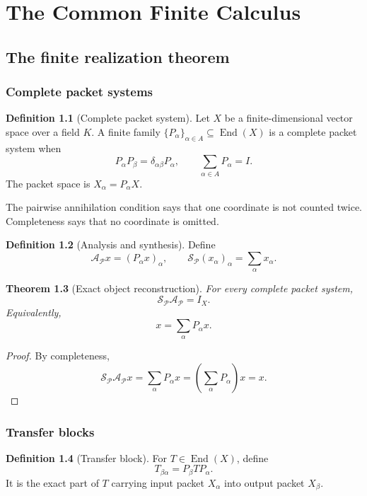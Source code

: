 \documentclass[11pt,oneside]{book}
\newtheorem{theorem}{Theorem}[chapter]
\theoremstyle{definition}
\newtheorem{definition}[theorem]{Definition}
\theoremstyle{remark}
\newcommand{\Id}{I}
\newcommand{\Acal}{\mathcal A}
\newcommand{\Scal}{\mathcal S}
\begin{document}
\tableofcontents

\mainmatter

\part{The Common Finite Calculus}



\chapter{The finite realization theorem}\label{ch:core}

\section{Complete packet systems}
\begin{definition}[Complete packet system]
Let $X$ be a finite-dimensional vector space over a field $K$. A finite family $\{P_\alpha\}_{\alpha\in A}\subseteq\operatorname{End}(X)$ is a complete packet system when
\[
P_\alpha P_\beta=\delta_{\alpha\beta}P_\alpha,
\qquad
\sum_{\alpha\in A}P_\alpha=\Id.
\]
The packet space is $X_\alpha=P_\alpha X$.
\end{definition}

The pairwise annihilation condition says that one coordinate is not counted twice. Completeness says that no coordinate is omitted.

\begin{definition}[Analysis and synthesis]
Define
\[
\Acal_{\mathcal P}x=(P_\alpha x)_\alpha,
\qquad
\Scal_{\mathcal P}(x_\alpha)_\alpha=\sum_\alpha x_\alpha.
\]
\end{definition}

\begin{theorem}[Exact object reconstruction]\label{thm:object-reconstruction}
For every complete packet system,
\[
\boxed{\Scal_{\mathcal P}\Acal_{\mathcal P}=\Id_X.}
\]
Equivalently,
\[
\boxed{x=\sum_\alpha P_\alpha x.}
\]
\end{theorem}

\begin{proof}
By completeness,
\[
\Scal_{\mathcal P}\Acal_{\mathcal P}x
=\sum_\alpha P_\alpha x
=\left(\sum_\alpha P_\alpha\right)x
=x.
\]
\end{proof}

\section{Transfer blocks}
\begin{definition}[Transfer block]
For $T\in\operatorname{End}(X)$, define
\[
T_{\beta\alpha}=P_\beta T P_\alpha.
\]
It is the exact part of $T$ carrying input packet $X_\alpha$ into output packet $X_\beta$.
\end{definition}
\end{document}
